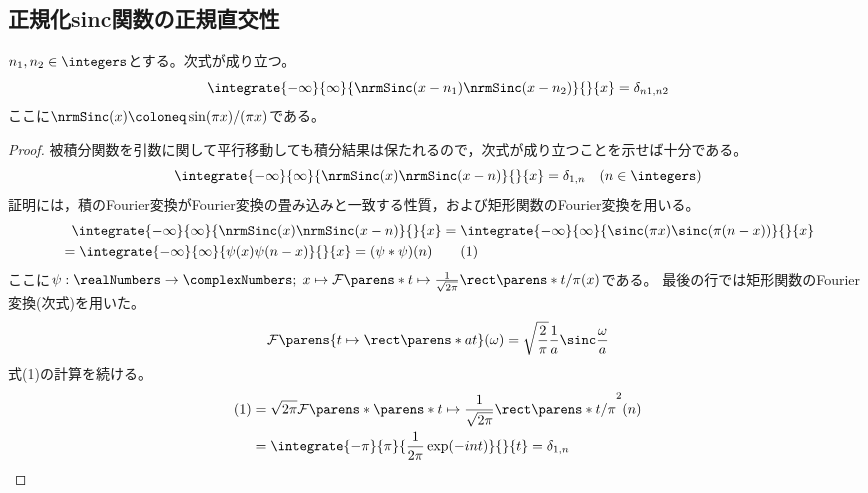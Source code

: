         \subsection{正規化sinc関数の正規直交性}
            \begin{shadebox}
                $n_1,n_2\in\integers$とする。次式が成り立つ。
                \[ \integrate{-\infty}{\infty}{\nrmSinc(x-n_1) \nrmSinc(x-n_2)}{}{x} = \delta_{n1,n2} \]
                ここに$\nrmSinc(x) \coloneq \sin(\pi x)/(\pi x)$である。
            \end{shadebox}
            \begin{proof}
                被積分関数を引数に関して平行移動しても積分結果は保たれるので，次式が成り立つことを示せば十分である。
                \[ \integrate{-\infty}{\infty}{\nrmSinc(x)\nrmSinc(x-n)}{}{x} = \delta_{1,n} \quad (n\in\integers) \]
                証明には，積のFourier変換がFourier変換の畳み込みと一致する性質，および矩形関数のFourier変換を用いる。
                \begin{align*}
                    &\phantom{=} \integrate{-\infty}{\infty}{\nrmSinc(x)\nrmSinc(x-n)}{}{x} = \integrate{-\infty}{\infty}{\sinc(\pi x)\sinc(\pi(n-x))}{}{x} \\
                    &= \integrate{-\infty}{\infty}{\psi(x)\psi(n-x)}{}{x} = (\psi*\psi)(n) \tag{1}
                \end{align*}
                ここに$\psi: \realNumbers\to\complexNumbers;\;x\mapsto\mathcal{F}\parens*{t\mapsto\frac{1}{\sqrt{2\pi}}\rect\parens*{t/\pi}}(x)$である。
                最後の行では矩形関数のFourier変換(次式)を用いた。
                \[ \mathcal{F}\parens{t\mapsto\rect\parens*{at}}(\omega) = \sqrt{\frac{2}{\pi}}\frac{1}{a}\sinc\frac{\omega}{a} \]
                式(1)の計算を続ける。
                \begin{align*}
                    (1) &= \sqrt{2\pi}\mathcal{F}\parens*{\parens*{t\mapsto\frac{1}{\sqrt{2\pi}}\rect\parens*{t/\pi}}^2}(n) \\
                    &= \integrate{-\pi}{\pi}{\frac{1}{2\pi}\exp(-i n t)}{}{t} = \delta_{1,n}
                \end{align*}
            \end{proof}